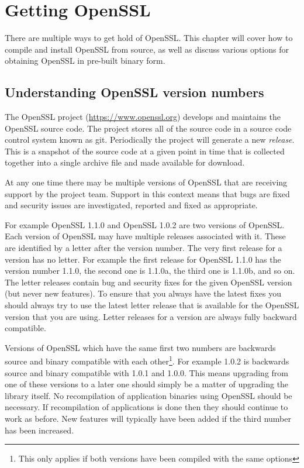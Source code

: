 \chapter{Getting OpenSSL}
\label{chp:getting-openssl}

There are multiple ways to get hold of OpenSSL. This chapter will cover
how to compile and install OpenSSL from source, as well as discuss various
options for obtaining OpenSSL in pre-built binary form.

\section{Understanding OpenSSL version numbers}

The OpenSSL project (\url{https://www.openssl.org}) develops and
maintains the OpenSSL source code. The project stores all of the source
code in a source code control system known as git. Periodically the
project will generate a new \emph{release}. This is a snapshot of the source
code at a given point in time that is collected together into a single archive
file and made available for download.

At any one time there may be multiple versions of OpenSSL that are receiving
support by the project team. Support in this context means that bugs are
fixed and security issues are investigated, reported and fixed as appropriate.

For example OpenSSL 1.1.0 and OpenSSL 1.0.2 are two versions of OpenSSL. Each
version of OpenSSL may have multiple releases associated with it. These are
identified by a letter after the version number. The very first release for
a version has no letter. For example the first release for OpenSSL 1.1.0 has
the version number 1.1.0, the second one is 1.1.0a, the third one is 1.1.0b,
and so on. The letter releases contain bug and security fixes for the given
OpenSSL version (but never new features). To ensure that you always have the
latest fixes you should always try to use the latest letter release that is
available for the OpenSSL version that you are using. Letter releases for a
version are always fully backward compatible.

Versions of OpenSSL which have the same first two numbers are backwards source
and binary compatible with each other\footnote{This only applies if both versions
have been compiled with the same options}. For example 1.0.2 is backwards
source and binary compatible with 1.0.1 and 1.0.0. This means upgrading from
one of these versions to a later one should simply be a matter of upgrading the
library itself. No recompilation of application binaries using OpenSSL should be
necessary. If recompilation of applications is done then they should continue to
work as before. New features will typically have been added if the third number
has been increased.

